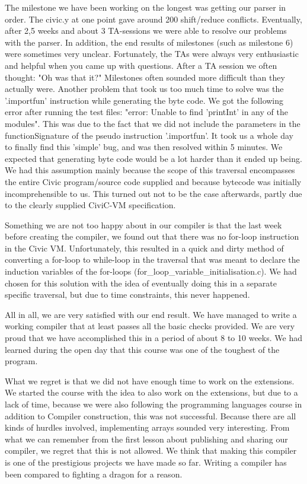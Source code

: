 \documentclass[hidelinks]{uva-inf-article}
\begin{document}
The milestone we have been working on the longest was getting our parser in order.
The civic.y at one point gave around 200 shift/reduce conflicts. Eventually, after 2,5 weeks and about 3 TA-sessions we were able to resolve our problems with the parser.
In addition, the end results of milestones (such as milestone 6) were sometimes very unclear. Fortunately, the TAs were always very enthusiastic and helpful when you came up with questions. 
After a TA session we often thought: "Oh was that it?" Milestones often sounded more difficult than they actually were.
Another problem that took us too much time to solve was the '.importfun' instruction while generating the byte code. 
We got the following error after running the test files: "error: Unable to find 'printInt' in any of the modules". 
This was due to the fact that we did not include the parameters in the functionSignature of the pseudo instruction '.importfun'. 
It took us a whole day to finally find this 'simple' bug, and was then resolved within 5 minutes.
We expected that generating byte code would be a lot harder than it ended up being. 
We had this assumption mainly because the scope of this traversal encompasses the entire Civic program/source code supplied and because bytecode was initially 
incomprehensible to us. This turned out not to be the case afterwards, partly due to the clearly supplied CiviC-VM specification.

Something we are not too happy about in our compiler is that the last week before creating the compiler, we found out that there was no for-loop instruction in the Civic VM. 
Unfortunately, this resulted in a quick and dirty method of converting a for-loop to while-loop in the traversal that was meant to declare the induction variables of the for-loops 
(for\_loop\_variable\_initialisation.c). 
We had chosen for this solution with the idea of eventually doing this in a separate specific traversal, 
but due to time constraints, this never happened.

All in all, we are very satisfied with our end result. 
We have managed to write a working compiler that at least passes all the basic checks provided. 
We are very proud that we have accomplished this in a period of about 8 to 10 weeks. 
We had learned during the open day that this course was one of the toughest of the program.

What we regret is that we did not have enough time to work on the extensions. 
We started the course with the idea to also work on the extensions, but due to a lack of time,
because we were also following the programming languages course in addition to Compiler construction, this was not successful.
Because there are all kinds of hurdles involved, implementing arrays sounded very interesting.
From what we can remember from the first lesson about publishing and sharing our compiler, 
we regret that this is not allowed. We think that making this compiler is one of the prestigious projects we have made so far. 
Writing a compiler has been compared to fighting a dragon for a reason.
\end{document}
